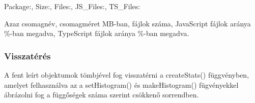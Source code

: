 \begin{cpp}
	{Package:, Size:, Files:, JS_Files:, TS_Files:}
\end{cpp}
Azaz csomagnév, csomagméret MB-ban, fájlok száma, JavaScript fájlok aránya \%-ban megadva, TypeScript fájlok aránya \%-ban megadva.

\subsubsection{Visszatérés}

A fent leírt objektumok tömbjével fog visszatérni a createStats() függvényben, amelyet felhasználva az a setHistogram() és makeHistogram() fügvényekkel ábrázolni fog a függőségek száma szerint csökkenő sorrendben.

